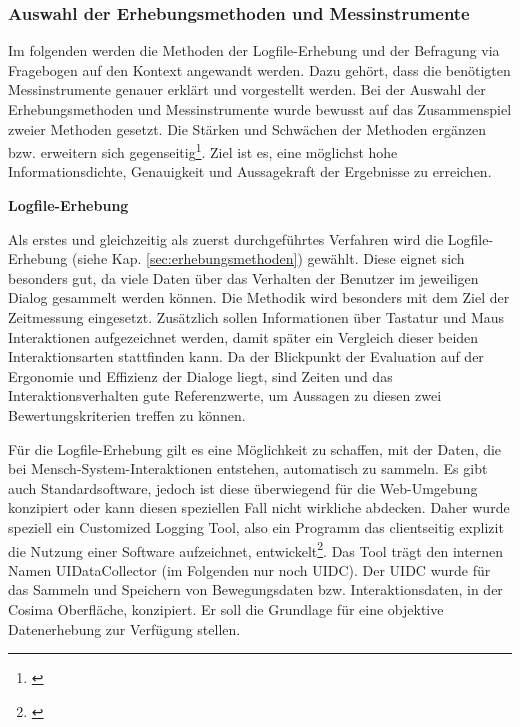 
\subsubsection{Auswahl der Erhebungsmethoden und Messinstrumente}
Im folgenden werden die Methoden der Logfile-Erhebung und der Befragung via Fragebogen auf den Kontext angewandt werden. Dazu gehört, dass die benötigten Messinstrumente genauer erklärt und vorgestellt werden. Bei der Auswahl der Erhebungsmethoden und Messinstrumente wurde bewusst auf das Zusammenspiel zweier Methoden gesetzt. Die Stärken und Schwächen der Methoden ergänzen bzw. erweitern sich gegenseitig\footnote{\cite[vgl.][5\psq]{Priemer2004}}. Ziel ist es, eine möglichst hohe Informationsdichte, Genauigkeit und Aussagekraft der Ergebnisse zu erreichen. 

\textbf{Logfile-Erhebung}

Als erstes und gleichzeitig als zuerst durchgeführtes Verfahren wird die Logfile-Erhebung (siehe Kap. \ref{sec:erhebungsmethoden}) gewählt. Diese eignet sich besonders gut, da viele Daten über das Verhalten der Benutzer im jeweiligen Dialog gesammelt werden können. Die Methodik wird besonders mit dem Ziel der Zeitmessung eingesetzt. Zusätzlich sollen Informationen über Tastatur und Maus Interaktionen aufgezeichnet werden, damit später ein Vergleich dieser beiden Interaktionsarten stattfinden kann. Da der Blickpunkt der Evaluation auf der Ergonomie und Effizienz der Dialoge liegt, sind Zeiten und das Interaktionsverhalten gute Referenzwerte, um Aussagen zu diesen zwei Bewertungskriterien treffen zu können.

Für die Logfile-Erhebung gilt es eine Möglichkeit zu schaffen, mit der Daten, die bei Mensch-System-Interaktionen entstehen, automatisch zu sammeln. Es gibt auch Standardsoftware, jedoch ist diese überwiegend für die Web-Umgebung konzipiert oder kann diesen speziellen Fall nicht wirkliche abdecken. Daher wurde speziell ein Customized Logging Tool, also ein Programm das clientseitig explizit die Nutzung einer Software aufzeichnet, entwickelt\footnote{\cite[vgl.][3]{Priemer2004}}. Das Tool trägt den internen Namen UIDataCollector (im Folgenden nur noch UIDC). Der UIDC wurde für das Sammeln und Speichern von Bewegungsdaten bzw. Interaktionsdaten, in der Cosima Oberfläche, konzipiert. Er soll die Grundlage für eine objektive Datenerhebung zur Verfügung stellen.

